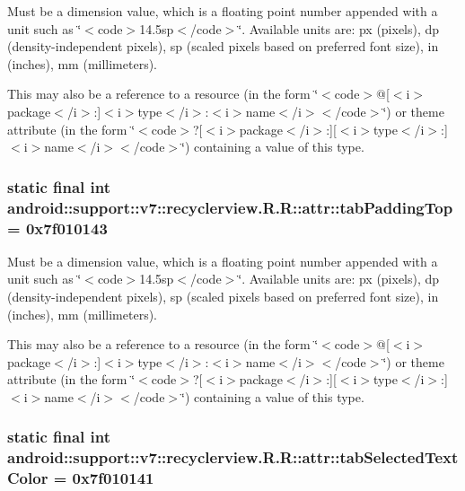 Must be a dimension value, which is a floating point number appended with a unit such as \char`\"{}$<$code$>$14.5sp$<$/code$>$\char`\"{}. Available units are: px (pixels), dp (density-independent pixels), sp (scaled pixels based on preferred font size), in (inches), mm (millimeters). 

This may also be a reference to a resource (in the form \char`\"{}$<$code$>$@\mbox{[}$<$i$>$package$<$/i$>$:\mbox{]}$<$i$>$type$<$/i$>$:$<$i$>$name$<$/i$>$$<$/code$>$\char`\"{}) or theme attribute (in the form \char`\"{}$<$code$>$?\mbox{[}$<$i$>$package$<$/i$>$:\mbox{]}\mbox{[}$<$i$>$type$<$/i$>$:\mbox{]}$<$i$>$name$<$/i$>$$<$/code$>$\char`\"{}) containing a value of this type. \hypertarget{classandroid_1_1support_1_1v7_1_1recyclerview_1_1_r_1_1attr_0dc0f4644c6e363f5c0c82b7f847b80d}{
\subsubsection[{tabPaddingTop}]{\setlength{\rightskip}{0pt plus 5cm}static final int android::support::v7::recyclerview.R.R::attr::tabPaddingTop = 0x7f010143}}
\label{classandroid_1_1support_1_1v7_1_1recyclerview_1_1_r_1_1attr_0dc0f4644c6e363f5c0c82b7f847b80d}


Must be a dimension value, which is a floating point number appended with a unit such as \char`\"{}$<$code$>$14.5sp$<$/code$>$\char`\"{}. Available units are: px (pixels), dp (density-independent pixels), sp (scaled pixels based on preferred font size), in (inches), mm (millimeters). 

This may also be a reference to a resource (in the form \char`\"{}$<$code$>$@\mbox{[}$<$i$>$package$<$/i$>$:\mbox{]}$<$i$>$type$<$/i$>$:$<$i$>$name$<$/i$>$$<$/code$>$\char`\"{}) or theme attribute (in the form \char`\"{}$<$code$>$?\mbox{[}$<$i$>$package$<$/i$>$:\mbox{]}\mbox{[}$<$i$>$type$<$/i$>$:\mbox{]}$<$i$>$name$<$/i$>$$<$/code$>$\char`\"{}) containing a value of this type. \hypertarget{classandroid_1_1support_1_1v7_1_1recyclerview_1_1_r_1_1attr_c7b3b30c0b2888c40c81679b4c5cabf7}{
\subsubsection[{tabSelectedTextColor}]{\setlength{\rightskip}{0pt plus 5cm}static final int android::support::v7::recyclerview.R.R::attr::tabSelectedTextColor = 0x7f010141}}
\label{classandroid_1_1support_1_1v7_1_1recyclerview_1_1_r_1_1attr_c7b3b30c0b2888c40c81679b4c5cabf7}


